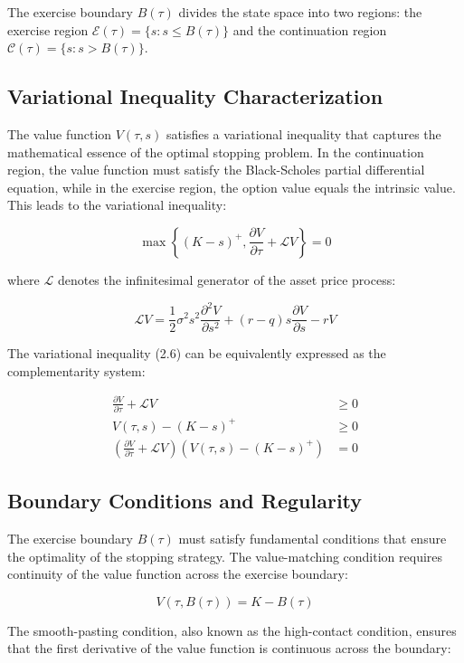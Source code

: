 \documentclass[
  american,
  11pt,
  11pt,
  letterpaper,
  onecolumn]{article}
\begin{document}
The exercise boundary \(B(\tau)\) divides the state space into two
regions: the exercise region
\(\mathcal{E}(\tau) = \{s : s \leq B(\tau)\}\) and the continuation
region \(\mathcal{C}(\tau) = \{s : s > B(\tau)\}\).

\subsection{Variational Inequality
Characterization}\label{variational-inequality-characterization}

The value function \(V(\tau,s)\) satisfies a variational inequality that
captures the mathematical essence of the optimal stopping problem. In
the continuation region, the value function must satisfy the
Black-Scholes partial differential equation, while in the exercise
region, the option value equals the intrinsic value. This leads to the
variational inequality:

\[\max\left\{(K-s)^+, \frac{\partial V}{\partial \tau} + \mathcal{L}V\right\} = 0 \tag{2.6}\]

where \(\mathcal{L}\) denotes the infinitesimal generator of the asset
price process:

\[\mathcal{L}V = \frac{1}{2}\sigma^2 s^2 \frac{\partial^2 V}{\partial s^2} + (r-q)s\frac{\partial V}{\partial s} - rV \tag{2.7}\]

The variational inequality (2.6) can be equivalently expressed as the
complementarity system:

\[\begin{aligned}
\frac{\partial V}{\partial \tau} + \mathcal{L}V &\geq 0 \\
V(\tau,s) - (K-s)^+ &\geq 0 \\
\left(\frac{\partial V}{\partial \tau} + \mathcal{L}V\right)(V(\tau,s) - (K-s)^+) &= 0
\end{aligned} \tag{2.8}\]

\subsection{Boundary Conditions and
Regularity}\label{boundary-conditions-and-regularity}

The exercise boundary \(B(\tau)\) must satisfy fundamental conditions
that ensure the optimality of the stopping strategy. The value-matching
condition requires continuity of the value function across the exercise
boundary:

\[V(\tau, B(\tau)) = K - B(\tau) \tag{2.9}\]

The smooth-pasting condition, also known as the high-contact condition,
ensures that the first derivative of the value function is continuous
across the boundary:
\end{document}
